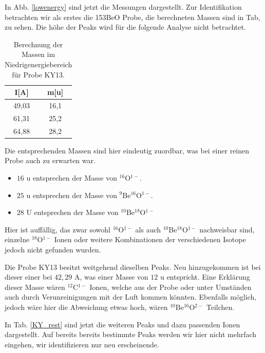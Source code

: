 In Abb. \ref{lowenergy} sind jetzt die Messungen dargestellt.
Zur Identifikation betrachten wir als erstes die 153BeO Probe, die berechneten Massen sind in Tab,  zu sehen.
Die höhe der Peaks wird für die folgende Analyse nicht betrachtet.
\begin{table}[h]
\centering
\caption{Berechnung der Massen im Niedrigenergiebereich für Probe KY13.}
\begin{tabular}{|c |c|}
\hline
I[A] & m[u] \\
\hline
49,03 & 16,1 \\
61,31 & 25,2 \\
64,88 & 28,2 \\
\hline
\end{tabular}
\label{153Be}
\end{table}
Die entsprechenden Massen sind hier eindeutig zuordbar, was bei einer reinen Probe auch zu erwarten war.
\begin{itemize}
\item $16$ u entsprechen der Masse von $^{16}$O$^{1-}$.
\item $25$ u entsprechen der Masse von $^{9}$Be$^{16}$O$^{1-}$.
\item $28$ U entsprechen der Masse von $^{10}$Be$^{18}$O$^{1-}$
\end{itemize}
Hier ist auffällig, das zwar sowohl $^{16}$O$^{1-}$ als auch  $^{10}$Be$^{18}$O$^{1-}$ nachweisbar sind, einzelne  $^{18}$O$^{1-}$ Ionen oder  weitere Kombinationen der verschiedenen Isotope jedoch nicht gefunden wurden.

Die Probe KY13 besitzt weitgehend dieselben Peaks.
Neu hinzugekommen ist bei dieser einer bei $42,29$ A, was einer Masse von $12$ u entspricht.
Eine Erklärung dieser Masse wären $^{12}$C$^{1-}$ Ionen, welche aus der Probe  oder unter Umständen auch durch Verunreinigungen mit der Luft kommen könnten.
Ebenfalls möglich, jedoch wäre hier die Abweichung etwas hoch, wären $^{10}$Be$^{16}$O$^{2-}$ Teilchen.

In Tab. \ref{KY_rest} sind jetzt die weiteren Peaks und dazu passenden Ionen dargestellt.
Auf bereits bereits bestimmte Peaks werden wir hier nicht mehrfach eingehen, wir identifizieren nur neu erscheinende.

